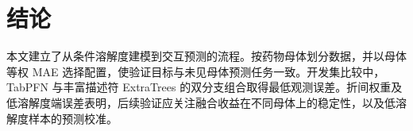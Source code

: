 \section{结论}
本文建立了从条件溶解度建模到交互预测的流程。按药物母体划分数据，并以母体等权 MAE 选择配置，使验证目标与未见母体预测任务一致。开发集比较中，TabPFN 与丰富描述符 ExtraTrees 的双分支组合取得最低观测误差。折间权重及低溶解度端误差表明，后续验证应关注融合收益在不同母体上的稳定性，以及低溶解度样本的预测校准。
